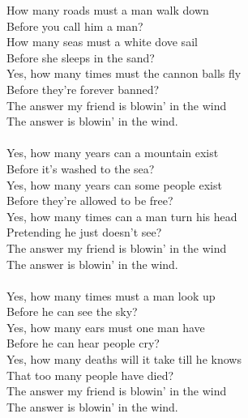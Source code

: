 \vspace{10pt}
How many roads must a man walk down\\
Before you call him a man?\\
How many seas must a white dove sail\\
Before she sleeps in the sand?\\
Yes, how many times must the cannon balls fly\\
Before they're forever banned?\\
The answer my friend is blowin' in the wind\\
The answer is blowin' in the wind.\\
\\
Yes, how many years can a mountain exist\\
Before it's washed to the sea?\\
Yes, how many years can some people exist\\
Before they're allowed to be free?\\
Yes, how many times can a man turn his head\\
Pretending he just doesn't see?\\
The answer my friend is blowin' in the wind\\
The answer is blowin' in the wind.\\
\\
Yes, how many times must a man look up\\
Before he can see the sky?\\
Yes, how many ears must one man have\\
Before he can hear people cry?\\
Yes, how many deaths will it take till he knows\\
That too many people have died?\\
The answer my friend is blowin' in the wind\\
The answer is blowin' in the wind.\\
\\
{\footnotesize\textit{}}
